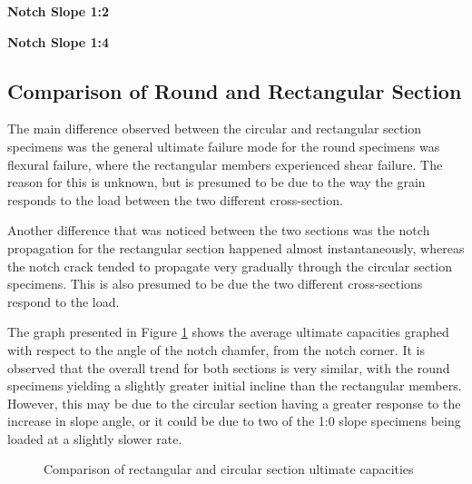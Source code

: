 \documentclass[11pt,a4paper]{article}
\numberwithin{equation}{subsection}
\begin{document}
\noindent
\textbf{Notch Slope 1:2}\par
\noindent

\vspace*{\baselineskip}

\noindent
\textbf{Notch Slope 1:4}\par
\noindent


\subsection{Comparison of Round and Rectangular Section}
The main difference observed between the circular and rectangular section specimens was the general ultimate failure mode for the round specimens was flexural failure, where the rectangular members experienced shear failure. The reason for this is unknown, but is presumed to be due to the way the grain responds to the load between the two different cross-section. 
\vspace*{\baselineskip}

\noindent
Another difference that was noticed between the two sections was the notch propagation for the rectangular section happened almost instantaneously, whereas the notch crack tended to propagate very gradually through the circular section specimens. This is also presumed to be due the two different cross-sections respond to the load. 

\vspace*{\baselineskip}

\noindent
The graph presented in Figure \ref{fig:compare_cap} shows the average ultimate capacities graphed with respect to the angle of the notch chamfer, from the notch corner. It is observed that the overall trend for both sections is very similar, with the round specimens yielding a slightly greater initial incline than the rectangular members. However, this may be due to the circular section having a greater response to the increase in slope angle, or it could be  due to two of the 1:0 slope specimens being loaded at a slightly slower rate.

\begin{figure}[h]
	\begin{center}
	\end{center}
	\caption{Comparison of rectangular and circular section ultimate capacities}
	\label{fig:compare_cap}
\end{figure}
\end{document}
